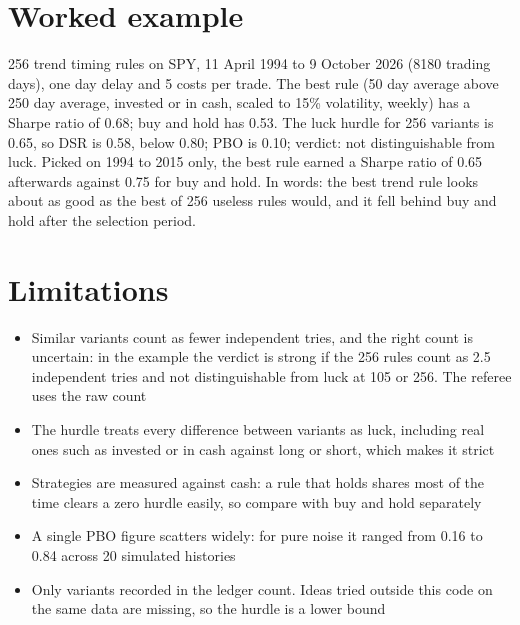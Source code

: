 \documentclass[10pt,a4paper]{article}
\begin{document}
\section{Worked example}
256 trend timing rules on SPY, 11 April 1994 to 9 October 2026 (\num{8180} trading days), one day delay and 5\bp{} costs per trade.
The best rule (50 day average above 250 day average, invested or in cash, scaled to 15\% volatility, weekly) has a Sharpe ratio of 0.68; buy and hold has 0.53.
The luck hurdle for 256 variants is 0.65, so DSR is 0.58, below 0.80; PBO is 0.10; verdict: not distinguishable from luck.
Picked on 1994 to 2015 only, the best rule earned a Sharpe ratio of 0.65 afterwards against 0.75 for buy and hold.
In words: the best trend rule looks about as good as the best of 256 useless rules would, and it fell behind buy and hold after the selection period.

\section{Limitations}
\begin{itemize}
  \item Similar variants count as fewer independent tries, and the right count is uncertain: in the example the verdict is strong if the 256 rules count as 2.5 independent tries and not distinguishable from luck at 105 or 256. The referee uses the raw count
  \item The hurdle treats every difference between variants as luck, including real ones such as invested or in cash against long or short, which makes it strict
  \item Strategies are measured against cash: a rule that holds shares most of the time clears a zero hurdle easily, so compare with buy and hold separately
  \item A single PBO figure scatters widely: for pure noise it ranged from 0.16 to 0.84 across 20 simulated histories
  \item Only variants recorded in the ledger count. Ideas tried outside this code on the same data are missing, so the hurdle is a lower bound
\end{itemize}
\end{document}
